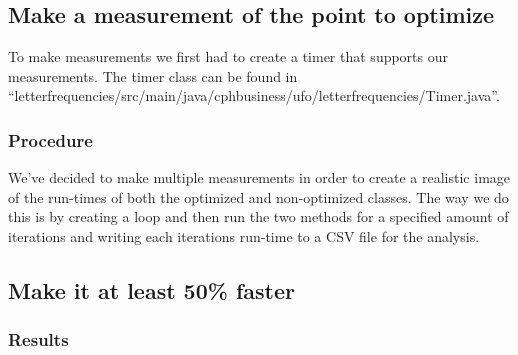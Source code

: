 \documentclass{article}
\begin{document}
\subsection{Make a measurement of the point to optimize}
To make measurements we first had to create a timer that supports our 
measurements. The timer class can be found in 
``letterfrequencies/src/main/java/cphbusiness/ufo/letterfrequencies/Timer.java''.

\subsubsection*{Procedure}
We've decided to make multiple measurements in order to create a realistic image 
of the run-times of both the optimized and non-optimized classes. The way we do this
is by creating a loop and then run the two methods for a specified amount of iterations
and writing each iterations run-time to a CSV file for the analysis. 


\subsection{Make it at least 50\% faster}

\subsubsection*{Results}
\end{document}
